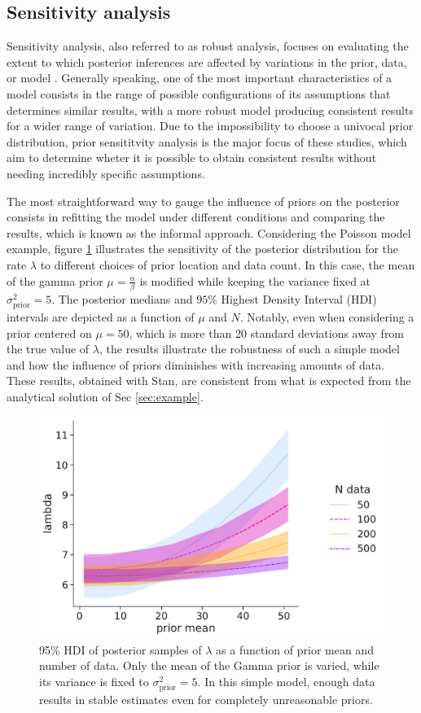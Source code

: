 \subsection{Sensitivity analysis}
Sensitivity analysis, also referred to as robust analysis, focuses on evaluating the extent to which posterior
inferences are affected by variations in the prior, data, or model \cite{ruggeri2005robust}. 
Generally speaking, one of the most important characteristics of a model consists in the range of possible
configurations of its assumptions that determines similar results, with a more robust model producing consistent results for a wider range of variation. Due to the impossibility to choose a univocal prior distribution, prior sensititvity analysis is the major focus of these studies, which aim to determine wheter it is possible to obtain consistent results without needing incredibly specific assumptions.

The most straightforward way to gauge the influence of priors on the posterior consists in refitting the model under
different conditions and comparing the results, which is known as the informal approach. Considering the Poisson model
example, figure \ref{fig:poisson_sens} illustrates the sensitivity of the posterior distribution for the rate $\lambda$
to different choices of prior location and data count. In this case, the mean of the gamma prior $\mu=\frac{\alpha}
{\beta}$ is modified while keeping the variance fixed at $\sigma_{\text{prior}}^2=5$. The posterior medians and $95\%$ Highest Density
Interval (HDI) intervals are depicted as a function of $\mu$ and $N$. Notably, even when considering a prior centered on
$\mu=50$, which is more than 20 standard deviations away from the true value of $\lambda$, the results illustrate the
robustness of such a simple model and how the influence of priors diminishes with increasing amounts of data. These
results, obtained with Stan, are consistent from what is expected from the analytical solution of Sec \ref{sec:example}.

\begin{figure}[t]
\centering
\includegraphics[width=0.85\linewidth]{figures/ch2/poisson/sens_0.pdf}
\caption{95\% HDI of posterior samples of $\lambda$ as a function of prior mean and number of data. Only the mean of
the Gamma prior is varied, while its variance is fixed to $\sigma_{\text{prior}}^2=5$. In this simple model, enough data results in stable estimates even for completely unreasonable priors.}
\label{fig:poisson_sens}
\end{figure}

